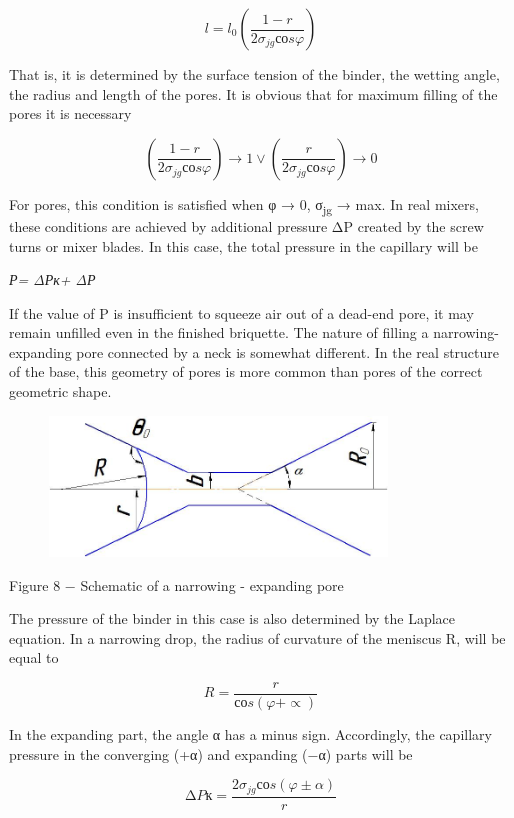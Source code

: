 \[l = l_{0}\left( \frac{1 - r}{2\sigma_{jg}соs\varphi} \right)\]

That is, it is determined by the surface tension of the binder, the
wetting angle, the radius and length of the pores. It is obvious that
for maximum filling of the pores it is necessary

\[\left( \frac{1 - r}{2\sigma_{jg}соs\varphi} \right) \rightarrow 1 \vee \left( \frac{r}{2\sigma_{jg}соs\varphi} \right) \rightarrow 0\]

For pores, this condition is satisfied when φ → 0, σ\textsubscript{jg} →
max. In real mixers, these conditions are achieved by additional
pressure ΔP created by the screw turns or mixer blades. In this case,
the total pressure in the capillary will be

\emph{Р= ΔРк+ ΔР}

If the value of P is insufficient to squeeze air out of a dead-end pore,
it may remain unfilled even in the finished briquette. The nature of
filling a narrowing-expanding pore connected by a neck is somewhat
different. In the real structure of the base, this geometry of pores is
more common than pores of the correct geometric shape.

\begin{figure}[H]
	\centering
	\includegraphics[width=0.8\textwidth]{media/gorn2/image11}
	\caption*{}
\end{figure}


Figure 8 − Schematic of a narrowing - expanding pore

The pressure of the binder in this case is also determined by the
Laplace equation. In a narrowing drop, the radius of curvature of the
meniscus R, will be equal to

\[R = \frac{r}{соs(\varphi + \propto )}\]

In the expanding part, the angle α has a minus sign. Accordingly, the
capillary pressure in the converging (+α) and expanding (−α) parts will
be

\[\mathrm{\Delta}Pк = \frac{2\sigma_{jg}соs(\varphi \pm \alpha)}{r}\]

